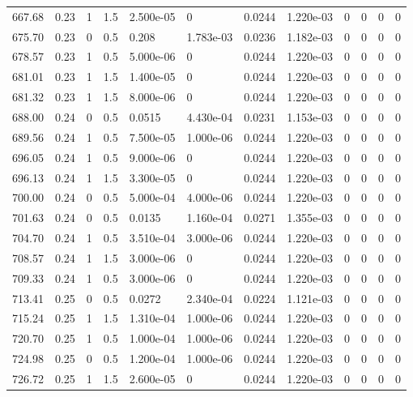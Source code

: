 \documentclass[preview]{standalone}
\begin{document}
{{{{{\begin{tabular}{L{1.2cm}C{1.2cm} C{0.3cm}C{0.5cm} C{1.4cm}C{1.4cm} C{1.4cm}C{1.4cm} C{1.6cm}C{1.6cm} C{1.6cm}C{1.6cm}}
  667.68  &  0.23  & 1     & 1.5 &  2.500e-05  & 0  &  0.0244&   1.220e-03& 0 & 0   &  0 & 0  \\ 
  675.70  &  0.23  & 0     & 0.5 &  0.208  & 1.783e-03  &  0.0236&   1.182e-03& 0 & 0   &  0 & 0  \\ 
  678.57  &  0.23  & 1     & 0.5 &  5.000e-06  & 0  &  0.0244&   1.220e-03& 0 & 0   &  0 & 0  \\ 
  681.01  &  0.23  & 1     & 1.5 &  1.400e-05  & 0  &  0.0244&   1.220e-03& 0 & 0   &  0 & 0  \\ 
  681.32  &  0.23  & 1     & 1.5 &  8.000e-06  & 0  &  0.0244&   1.220e-03& 0 & 0   &  0 & 0  \\ 
  688.00  &  0.24  & 0     & 0.5 &  0.0515  & 4.430e-04  &  0.0231&   1.153e-03& 0 & 0   &  0 & 0  \\ 
  689.56  &  0.24  & 1     & 0.5 &  7.500e-05  & 1.000e-06  &  0.0244&   1.220e-03& 0 & 0   &  0 & 0  \\ 
  696.05  &  0.24  & 1     & 0.5 &  9.000e-06  & 0  &  0.0244&   1.220e-03& 0 & 0   &  0 & 0  \\ 
  696.13  &  0.24  & 1     & 1.5 &  3.300e-05  & 0  &  0.0244&   1.220e-03& 0 & 0   &  0 & 0  \\ 
  700.00  &  0.24  & 0     & 0.5 &  5.000e-04  & 4.000e-06  &  0.0244&   1.220e-03& 0 & 0   &  0 & 0  \\ 
  701.63  &  0.24  & 0     & 0.5 &  0.0135  & 1.160e-04  &  0.0271&   1.355e-03& 0 & 0   &  0 & 0  \\ 
  704.70  &  0.24  & 1     & 0.5 &  3.510e-04  & 3.000e-06  &  0.0244&   1.220e-03& 0 & 0   &  0 & 0  \\ 
  708.57  &  0.24  & 1     & 1.5 &  3.000e-06  & 0  &  0.0244&   1.220e-03& 0 & 0   &  0 & 0  \\ 
  709.33  &  0.24  & 1     & 0.5 &  3.000e-06  & 0  &  0.0244&   1.220e-03& 0 & 0   &  0 & 0  \\ 
  713.41  &  0.25  & 0     & 0.5 &  0.0272  & 2.340e-04  &  0.0224&   1.121e-03& 0 & 0   &  0 & 0  \\ 
  715.24  &  0.25  & 1     & 1.5 &  1.310e-04  & 1.000e-06  &  0.0244&   1.220e-03& 0 & 0   &  0 & 0  \\ 
  720.70  &  0.25  & 1     & 0.5 &  1.000e-04  & 1.000e-06  &  0.0244&   1.220e-03& 0 & 0   &  0 & 0  \\ 
  724.98  &  0.25  & 0     & 0.5 &  1.200e-04  & 1.000e-06  &  0.0244&   1.220e-03& 0 & 0   &  0 & 0  \\ 
  726.72  &  0.25  & 1     & 1.5 &  2.600e-05  & 0  &  0.0244&   1.220e-03& 0 & 0   &  0 & 0  \\ 

\end{tabular}}}}}}
\end{document}
